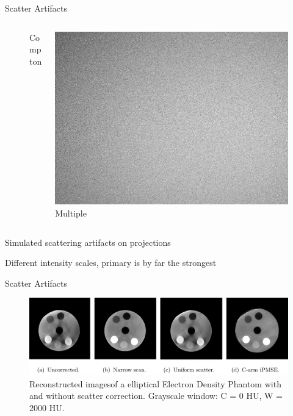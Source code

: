 \begin{frame}[c]{Scatter Artifacts}
\begin{figure}[]
\begin{columns}[t, onlytextwidth]
\begin{column}{0.25\textwidth}
				Compton
			\end{column}\begin{column}{0.25\textwidth}
				\centering{}
				\includegraphics[width=0.8\linewidth]{images/scatter_multiple.png}\\
				Multiple
			\end{column}
		\end{columns}
	\end{figure}
	\flushright{}
	\small Simulated scattering artifacts on projections

	Different intensity scales, primary is by far the strongest
\end{frame}




\begin{frame}[c]{Scatter Artifacts}
	\begin{figure}[htpb]
		\centering
		\includegraphics[height=0.55\textheight]{images/bier_scatter_correction_with_labels.png}
		\caption{Reconstructed imagesof a elliptical Electron Density Phantom with and without scatter correction. Grayscale window: C = 0 HU, W = 2000 HU.}%
	\end{figure}

	\vspace{0.5cm}
	\flushright{}
	\tiny

\end{frame}



